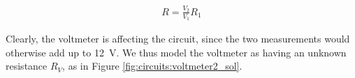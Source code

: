 \begin{finalanswer}
\begin{align*}
R=\frac{V_2}{V_1}R_1
\end{align*}
\end{finalanswer}
\begin{solution}
Clearly, the voltmeter is affecting the circuit, since the two measurements would otherwise add up to \SI{12}{V}. We thus model the voltmeter as having an unknown resistance $R_V$, as in Figure \ref{fig:circuits:voltmeter2_sol}.



\end{solution}
